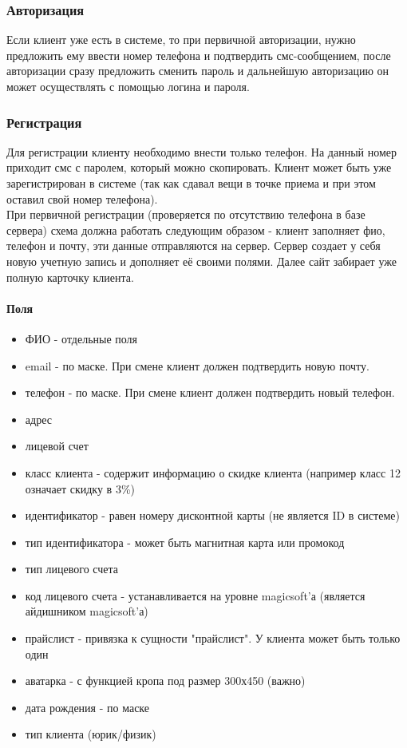 \documentclass[DIV=calc, paper=a4, fontsize=11pt]{scrartcl} %
\begin{document}
\subsubsection{Авторизация}
Если клиент уже есть в системе, то при первичной авторизации, нужно предложить ему ввести номер телефона и подтвердить смс-сообщением, после авторизации сразу предложить сменить пароль и дальнейшую авторизацию он может осуществлять с помощью логина и пароля.

\subsubsection{Регистрация}
Для регистрации клиенту необходимо внести только телефон. На данный номер приходит смс с паролем, который можно скопировать. Клиент может быть уже зарегистрирован в системе (так как сдавал вещи в точке приема и при этом оставил свой номер телефона).
\\[0.5cm]
При первичной регистрации (проверяется по отсутствию телефона в базе сервера) схема должна работать следующим образом - клиент заполняет фио, телефон и почту, эти данные отправляются на сервер. Сервер создает у себя новую учетную запись и дополняет её своими полями. Далее сайт забирает уже полную карточку клиента.

\paragraph{Поля}
\begin{itemize}
	\item ФИО - отдельные поля
	\item email - по маске. При смене клиент должен подтвердить новую почту.
	\item телефон - по маске. При смене клиент должен подтвердить новый телефон.
	\item адрес
	\item лицевой счет
	\item класс клиента - содержит информацию о скидке клиента (например класс 12 означает скидку в 3\%)
	\item идентификатор - равен номеру дисконтной карты (не является ID в системе)
	\item тип идентификатора - может быть магнитная карта или промокод
	\item тип лицевого счета
	\item код лицевого счета - устанавливается на уровне magicsoft'а (является айдишником magicsoft'а)
	\item прайслист - привязка к сущности "прайслист". У клиента может быть только один
	\item аватарка - с функцией кропа под размер 300х450 (важно)
	\item дата рождения - по маске
	\item тип клиента (юрик/физик)
\end{itemize}
\end{document}
